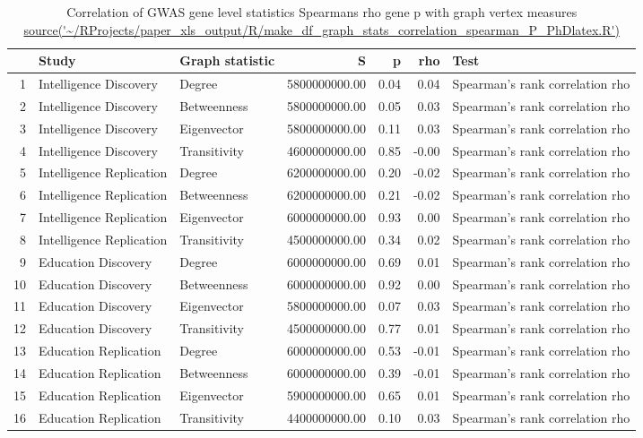 \begin{table}[ht]
\centering
  \begin{adjustbox}{max width=\textwidth}
\begin{tabular}{rllrrrl}
  \hline
 & Study & Graph statistic & S & p & rho & Test \\ 
  \hline
1 & Intelligence Discovery & Degree & 5800000000.00 & 0.04 & 0.04 & Spearman's rank correlation rho \\ 
  2 & Intelligence Discovery & Betweenness & 5800000000.00 & 0.05 & 0.03 & Spearman's rank correlation rho \\ 
  3 & Intelligence Discovery & Eigenvector & 5800000000.00 & 0.11 & 0.03 & Spearman's rank correlation rho \\ 
  4 & Intelligence Discovery & Transitivity & 4600000000.00 & 0.85 & -0.00 & Spearman's rank correlation rho \\ 
  5 & Intelligence Replication & Degree & 6200000000.00 & 0.20 & -0.02 & Spearman's rank correlation rho \\ 
  6 & Intelligence Replication & Betweenness & 6200000000.00 & 0.21 & -0.02 & Spearman's rank correlation rho \\ 
  7 & Intelligence Replication & Eigenvector & 6000000000.00 & 0.93 & 0.00 & Spearman's rank correlation rho \\ 
  8 & Intelligence Replication & Transitivity & 4500000000.00 & 0.34 & 0.02 & Spearman's rank correlation rho \\ 
  9 & Education Discovery & Degree & 6000000000.00 & 0.69 & 0.01 & Spearman's rank correlation rho \\ 
  10 & Education Discovery & Betweenness & 6000000000.00 & 0.92 & 0.00 & Spearman's rank correlation rho \\ 
  11 & Education Discovery & Eigenvector & 5800000000.00 & 0.07 & 0.03 & Spearman's rank correlation rho \\ 
  12 & Education Discovery & Transitivity & 4500000000.00 & 0.77 & 0.01 & Spearman's rank correlation rho \\ 
  13 & Education Replication & Degree & 6000000000.00 & 0.53 & -0.01 & Spearman's rank correlation rho \\ 
  14 & Education Replication & Betweenness & 6000000000.00 & 0.39 & -0.01 & Spearman's rank correlation rho \\ 
  15 & Education Replication & Eigenvector & 5900000000.00 & 0.65 & 0.01 & Spearman's rank correlation rho \\ 
  16 & Education Replication & Transitivity & 4400000000.00 & 0.10 & 0.03 & Spearman's rank correlation rho \\ 
   \hline
\end{tabular}
  \end{adjustbox}
\caption{Correlation of GWAS gene level statistics Spearmans rho gene p with graph vertex measures \url{source('~/RProjects/paper_xls_output/R/make_df_graph_stats_correlation_spearman_P_PhDlatex.R')}} 
\label{Table:Correlation of GWAS gene level statistics Spearmans rho gene p  with graph vertex measures}
\end{table}

